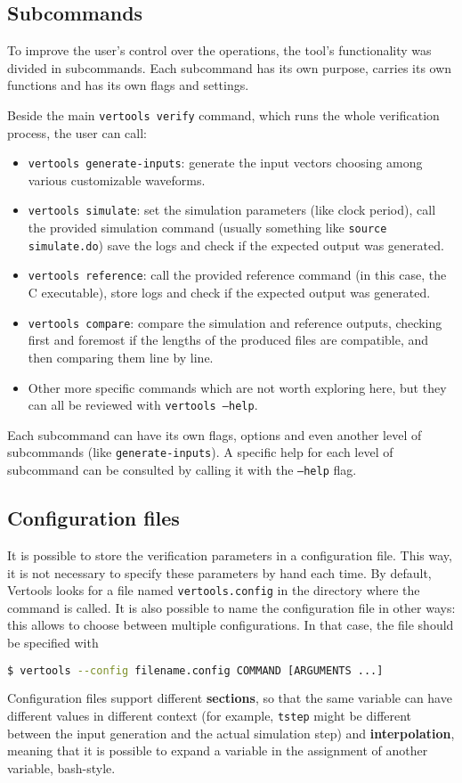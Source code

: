 \subsection{Subcommands}
To improve the user's control over the operations, the tool's functionality was divided in subcommands. Each subcommand has its own purpose, carries its own functions and has its own flags and settings.

Beside the main \texttt{vertools verify} command, which runs the whole verification process, the user can call:

\begin{itemize}
    \item \texttt{vertools generate-inputs}: generate the input vectors choosing among various customizable waveforms.
    \item \texttt{vertools simulate}: set the simulation parameters (like clock period), call the provided simulation command (usually something like \texttt{source simulate.do}) save the logs and check if the expected output was generated.
    \item \texttt{vertools reference}: call the provided reference command (in this case, the C executable), store logs and check if the expected output was generated.
    \item \texttt{vertools compare}: compare the simulation and reference outputs, checking first and foremost if the lengths of the produced files are compatible, and then comparing them line by line.
    \item Other more specific commands which are not worth exploring here, but they can all be reviewed with \texttt{vertools --help}.
\end{itemize}

Each subcommand can have its own flags, options and even another level of subcommands (like \texttt{generate-inputs}). A specific help for each level of subcommand can be consulted by calling it with the \texttt{--help} flag.

\subsection{Configuration files}
It is possible to store the verification parameters in a configuration file. This way, it is not necessary to specify these parameters by hand each time. By default, Vertools looks for a file named \texttt{vertools.config} in the directory where the command is called. It is also possible to name the configuration file in other ways: this allows to choose between multiple configurations. In that case, the file should be specified with
\begin{lstlisting}[language=bash]
    $ vertools --config filename.config COMMAND [ARGUMENTS ...]
\end{lstlisting}
Configuration files support different \textbf{sections}, so that the same variable can have different values in different context (for example, \texttt{tstep} might be different between the input generation and the actual simulation step) and \textbf{interpolation}, meaning that it is possible to expand a variable in the assignment of another variable, bash-style.

